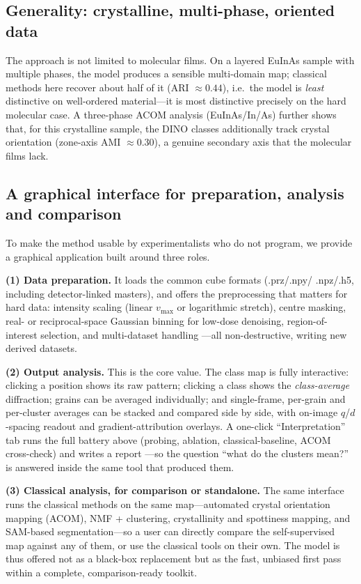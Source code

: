 \documentclass[journal=ancac3,manuscript=article,layout=twocolumn]{achemso}
\begin{document}
\subsection{Generality: crystalline, multi-phase, oriented data}
The approach is not limited to molecular films. On a layered EuInAs sample with
multiple phases, the model produces a sensible multi-domain map; classical
methods here recover about half of it (ARI $\approx0.44$), i.e.\ the model is
\emph{least} distinctive on well-ordered material---it is most distinctive
precisely on the hard molecular case. A three-phase ACOM analysis
(EuInAs/In/As) further shows that, for this crystalline sample, the DINO
classes additionally track crystal orientation (zone-axis AMI $\approx0.30$), a
genuine secondary axis that the molecular films lack.

\subsection{A graphical interface for preparation, analysis and comparison}
To make the method usable by experimentalists who do not program, we provide a
graphical application built around three roles.

\textbf{(1) Data preparation.} It loads the common cube formats (.prz/.npy/
.npz/.h5, including detector-linked masters), and offers the preprocessing that
matters for hard data: intensity scaling (linear $v_{\max}$ or logarithmic
stretch), centre masking, real- or reciprocal-space Gaussian binning for
low-dose denoising, region-of-interest selection, and multi-dataset handling
---all non-destructive, writing new derived datasets.

\textbf{(2) Output analysis.} This is the core value. The class map is fully
interactive: clicking a position shows its raw pattern; clicking a class shows
the \emph{class-average} diffraction; grains can be averaged individually; and
single-frame, per-grain and per-cluster averages can be stacked and compared
side by side, with on-image $q$/$d$-spacing readout and gradient-attribution
overlays. A one-click ``Interpretation'' tab runs the full battery above
(probing, ablation, classical-baseline, ACOM cross-check) and writes a report
---so the question ``what do the clusters mean?'' is answered inside the same
tool that produced them.

\textbf{(3) Classical analysis, for comparison or standalone.} The same
interface runs the classical methods on the same map---automated crystal
orientation mapping (ACOM), NMF + clustering, crystallinity and
spottiness mapping, and SAM-based segmentation---so a user can directly compare
the self-supervised map against any of them, or use the classical tools on
their own. The model is thus offered not as a black-box replacement but as the
fast, unbiased first pass within a complete, comparison-ready toolkit.
\end{document}
